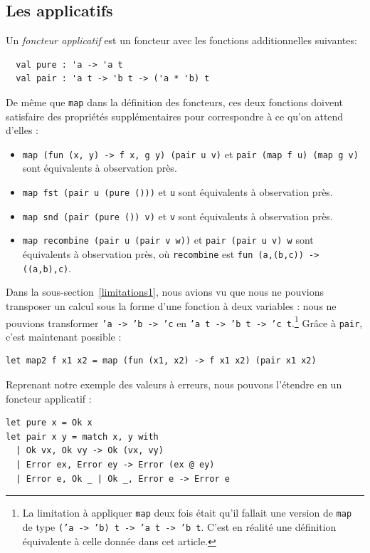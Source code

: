 \documentclass[final]{jflart}
\begin{document}
\subsection{Les applicatifs}
\begin{defi}
  Un \emph{foncteur applicatif} est un foncteur avec les fonctions additionnelles suivantes:

  \begin{verbatim}
  val pure : 'a -> 'a t
  val pair : 'a t -> 'b t -> ('a * 'b) t
  \end{verbatim}

  De même que \texttt{map} dans la définition des foncteurs, ces deux fonctions
  doivent satisfaire des propriétés supplémentaires pour correspondre à ce
  qu'on attend d'elles :
  \begin{itemize}
  \item \texttt{map (fun (x, y) -> f x, g y) (pair u v)} et \texttt{pair (map f u) (map g v)} sont équivalents à observation près.
  \item \texttt{map fst (pair u (pure ()))} et \texttt{u} sont équivalents à observation près.
  \item \texttt{map snd (pair (pure ()) v)} et \texttt{v} sont équivalents à observation près.
  \item \texttt{map recombine (pair u (pair v w))} et \texttt{pair (pair u v) w} sont équivalents à observation près, où \texttt{recombine} est \texttt{fun (a,(b,c)) -> ((a,b),c)}.
  \end{itemize}
\end{defi}

Dans la sous-section~\ref{limitations1}, nous avions vu que nous ne pouvions
transposer un calcul sous la forme d'une fonction à deux variables : nous ne
pouvions transformer \texttt{'a -> 'b -> 'c} en \texttt{'a t -> 'b t -> 'c
  t}.\footnote{La limitation à appliquer \texttt{map} deux fois était qu'il fallait une version de \texttt{map} de type \texttt{('a -> 'b) t -> 'a t -> 'b t}. C'est en réalité une définition équivalente à celle donnée dans cet article.} Grâce à \texttt{pair}, c'est maintenant possible :

\begin{verbatim}
let map2 f x1 x2 = map (fun (x1, x2) -> f x1 x2) (pair x1 x2)
\end{verbatim}

Reprenant notre exemple des valeurs à erreurs, nous pouvons l'étendre en un foncteur applicatif :

\begin{verbatim}
let pure x = Ok x
let pair x y = match x, y with
  | Ok vx, Ok vy -> Ok (vx, vy)
  | Error ex, Error ey -> Error (ex @ ey)
  | Error e, Ok _ | Ok _, Error e -> Error e
\end{verbatim}
\end{document}
